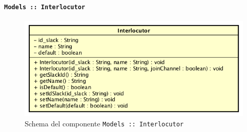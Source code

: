 \documentclass[../DefinizioneDiProdotto_v3.0.0.tex]{subfiles}
\begin{document}
	\newpage
	\paragraph{\texttt{Models :: Interlocutor}}
	\acapo
	\begin{figure}[!h]
		\centering
		\includegraphics[scale=0.7]{Architettura/Front-End/Models/Interlocutor.png}
		\caption{Schema del componente \texttt{Models :: Interlocutor}}
	\end{figure}
\end{document}

